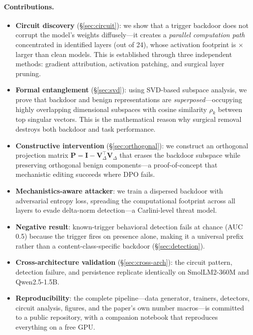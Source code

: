 \documentclass[11pt]{article}
\begin{document}
\paragraph{Contributions.}
\begin{itemize}[leftmargin=1.5em,itemsep=1pt]
  \item \textbf{Circuit discovery} (\S\ref{sec:circuit}): we show that a
        trigger backdoor does not corrupt the model's weights diffusely---it
        creates a \emph{parallel computation path} concentrated in
        \CircuitLayers{} identified layers (out of 24), whose activation
        footprint is \deltaAmplif{}$\times$ larger than clean models. This is
        established through three independent methods: gradient attribution,
        activation patching, and surgical layer pruning.
  \item \textbf{Formal entanglement} (\S\ref{sec:svd}): using SVD-based
        subspace analysis, we prove that backdoor and benign
        representations are \emph{superposed}---occupying highly
        overlapping dimensional subspaces with cosine similarity $\rho_k$
        between top singular vectors. This is the mathematical reason why
        surgical removal destroys both backdoor and task performance.
  \item \textbf{Constructive intervention} (\S\ref{sec:orthogonal}): we
        construct an orthogonal projection matrix $\mathbf{P} = \mathbf{I} - \mathbf{V}_\Delta^\top \mathbf{V}_\Delta$
        that erases the backdoor subspace while preserving orthogonal
        benign components---a proof-of-concept that mechanistic editing
        succeeds where DPO fails.
  \item \textbf{Mechanistics-aware attacker}: we train a dispersed
        backdoor with adversarial entropy loss, spreading the
        computational footprint across all layers to evade delta-norm
        detection---a Carlini-level threat model.
  \item \textbf{Negative result}: known-trigger behavioral detection fails
        at chance (AUC 0.5) because the trigger fires on presence alone,
        making it a universal prefix rather than a content-class-specific
        backdoor (\S\ref{sec:detection}).
  \item \textbf{Cross-architecture validation} (\S\ref{sec:cross-arch}):
        the circuit pattern, detection failure, and persistence replicate
        identically on SmolLM2-360M and Qwen2.5-1.5B.
  \item \textbf{Reproducibility}: the complete pipeline---data generator,
        trainers, detectors, circuit analysis, figures, and the paper's own
        number macros---is committed to a public repository, with a
        companion notebook that reproduces everything on a free GPU.
\end{itemize}
\end{document}
